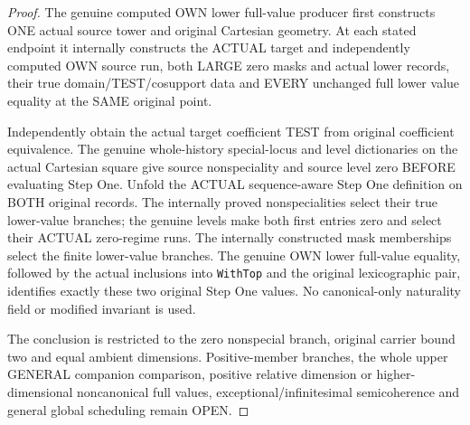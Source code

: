 \begin{proof}
The genuine computed OWN lower full-value producer first constructs ONE
actual source tower and original Cartesian geometry. At each stated
endpoint it internally constructs the ACTUAL target and independently
computed OWN source run, both LARGE zero masks and actual lower
records, their true domain/TEST/cosupport data and EVERY unchanged full
lower value equality at the SAME original point.

Independently obtain the actual target coefficient TEST from original
coefficient equivalence. The genuine whole-history special-locus and
level dictionaries on the actual Cartesian square give source
nonspeciality and source level zero BEFORE evaluating Step One. Unfold
the ACTUAL sequence-aware Step One definition on BOTH original records.
The internally proved nonspecialities select their true lower-value
branches; the genuine levels make both first entries zero and select
their ACTUAL zero-regime runs. The internally constructed mask
memberships select the finite lower-value branches. The genuine OWN
lower full-value equality, followed by the actual inclusions into
\texttt{WithTop} and the original lexicographic pair, identifies exactly
these two original Step One values. No canonical-only naturality field
or modified invariant is used.

The conclusion is restricted to the zero nonspecial branch, original
carrier bound two and equal ambient dimensions. Positive-member
branches, the whole upper GENERAL companion comparison, positive
relative dimension or higher-dimensional noncanonical full values,
exceptional/infinitesimal semicoherence and general global scheduling
remain OPEN.
\end{proof}
